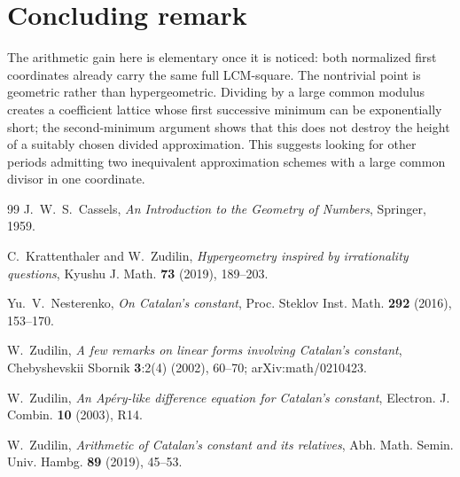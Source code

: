 \documentclass[11pt]{article}
\theoremstyle{definition}
\theoremstyle{remark}
\begin{document}
\section{Concluding remark}
The arithmetic gain here is elementary once it is noticed: both normalized first coordinates already carry the same full LCM-square.  The nontrivial point is geometric rather than hypergeometric.  Dividing by a large common modulus creates a coefficient lattice whose first successive minimum can be exponentially short; the second-minimum argument shows that this does not destroy the height of a suitably chosen divided approximation.  This suggests looking for other periods admitting two inequivalent approximation schemes with a large common divisor in one coordinate.

\begin{thebibliography}{99}
J.~W.~S.~Cassels,
\emph{An Introduction to the Geometry of Numbers}, Springer, 1959.

C.~Krattenthaler and W.~Zudilin,
\emph{Hypergeometry inspired by irrationality questions},
Kyushu J. Math. \textbf{73} (2019), 189--203.

Yu.~V.~Nesterenko,
\emph{On Catalan's constant},
Proc. Steklov Inst. Math. \textbf{292} (2016), 153--170.

W.~Zudilin,
\emph{A few remarks on linear forms involving Catalan's constant},
Chebyshevskii Sbornik \textbf{3}:2(4) (2002), 60--70;
arXiv:math/0210423.

W.~Zudilin,
\emph{An Ap\'ery-like difference equation for Catalan's constant},
Electron. J. Combin. \textbf{10} (2003), R14.

W.~Zudilin,
\emph{Arithmetic of Catalan's constant and its relatives},
Abh. Math. Semin. Univ. Hambg. \textbf{89} (2019), 45--53.
\end{thebibliography}
\end{document}
